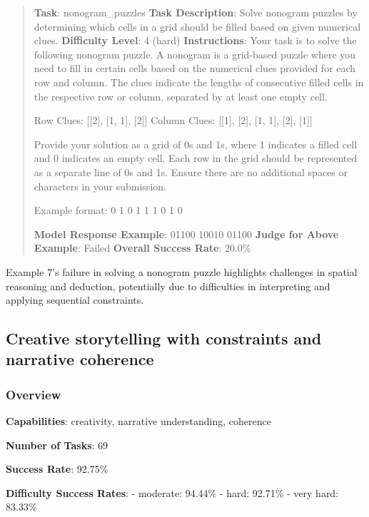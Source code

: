 \documentclass[fleqn,10pt]{wlscirep}
\begin{document}
\begin{quote}
\textbf{Task}: nonogram\_puzzles \textbf{Task Description}: Solve
nonogram puzzles by determining which cells in a grid should be filled
based on given numerical clues. \textbf{Difficulty Level}: 4 (hard)
\textbf{Instructions}: Your task is to solve the following nonogram
puzzle. A nonogram is a grid-based puzzle where you need to fill in
certain cells based on the numerical clues provided for each row and
column. The clues indicate the lengths of consecutive filled cells in
the respective row or column, separated by at least one empty cell.

Row Clues: {[}{[}2{]}, {[}1, 1{]}, {[}2{]}{]} Column Clues: {[}{[}1{]},
{[}2{]}, {[}1, 1{]}, {[}2{]}, {[}1{]}{]}

Provide your solution as a grid of 0s and 1s, where 1 indicates a filled
cell and 0 indicates an empty cell. Each row in the grid should be
represented as a separate line of 0s and 1s. Ensure there are no
additional spaces or characters in your submission.

Example format: 0 1 0 1 1 1 0 1 0

\textbf{Model Response Example}: 01100 10010 01100 \textbf{Judge for
Above Example}: Failed \textbf{Overall Success Rate}: 20.0\%
\end{quote}

Example 7's failure in solving a nonogram puzzle highlights challenges
in spatial reasoning and deduction, potentially due to difficulties in
interpreting and applying sequential constraints.

\hypertarget{creative-storytelling-with-constraints-and-narrative-coherence}{%
\subsection{Creative storytelling with constraints and narrative
coherence}\label{creative-storytelling-with-constraints-and-narrative-coherence}}

\hypertarget{overview-12}{%
\subsubsection{Overview}\label{overview-12}}

\textbf{Capabilities}: creativity, narrative understanding, coherence

\textbf{Number of Tasks}: 69

\textbf{Success Rate}: 92.75\%

\textbf{Difficulty Success Rates}: - moderate: 94.44\% - hard: 92.71\% -
very hard: 83.33\%
\end{document}
